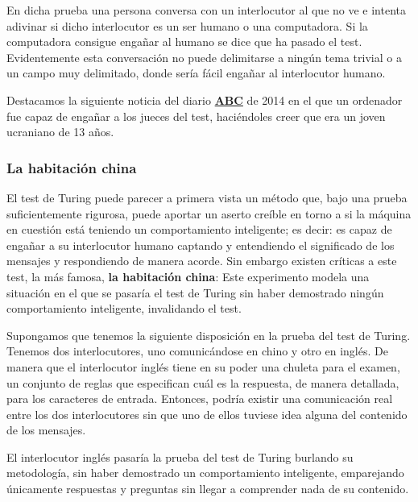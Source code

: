 \vspace{10px}

En dicha prueba una persona conversa con un interlocutor al que no ve e intenta adivinar si dicho interlocutor es un ser humano o una computadora. Si la computadora consigue engañar al humano se dice que ha pasado el test. Evidentemente esta conversación no puede delimitarse a ningún tema trivial o a un campo muy delimitado, donde sería fácil engañar al interlocutor humano.

\vspace{10px}

Destacamos la siguiente noticia del diario \href{https://www.abc.es/ciencia/20140609/abci-superordenador-supera-primera-test-201406091139.html}{\textbf{ABC}} de 2014 en el que un ordenador fue capaz de engañar a los jueces del test, haciéndoles creer que era un joven ucraniano de 13 años.


\subsubsection{La habitación china}

El test de Turing puede parecer a primera vista un método que, bajo una prueba suficientemente rigurosa, puede aportar un aserto creíble en torno a si la máquina en cuestión está teniendo un comportamiento inteligente; es decir: es capaz de engañar a su interlocutor humano captando y entendiendo el significado de los mensajes y respondiendo de manera acorde. Sin embargo existen críticas a este test, la más famosa, \textbf{la habitación china}: Este experimento modela una situación en el que se pasaría el test de Turing sin haber demostrado ningún comportamiento inteligente, invalidando el test.

Supongamos que tenemos la siguiente disposición en la prueba del test de Turing. Tenemos dos interlocutores, uno comunicándose en chino y otro en inglés. De manera que el interlocutor inglés tiene en su poder una chuleta para el examen, un conjunto de reglas que especifican cuál es la respuesta, de manera detallada, para los caracteres de entrada. Entonces, podría existir una comunicación real entre los dos interlocutores sin que uno de ellos tuviese idea alguna del contenido de los mensajes.

\vspace{10px}

El interlocutor inglés pasaría la prueba del test de Turing burlando su metodología, sin haber demostrado un comportamiento inteligente, emparejando únicamente respuestas y preguntas sin llegar a comprender nada de su contenido.

